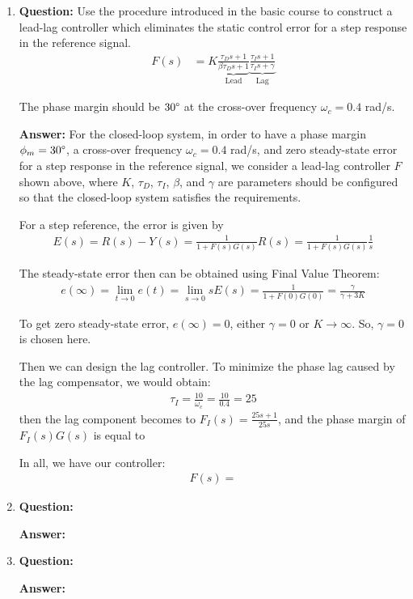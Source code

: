 \documentclass[11pt,a4paper]{article}
\begin{document}
\begin{enumerate}
	\item \textbf{Question:} Use the procedure introduced in the basic course to construct a lead-lag controller which eliminates the static control error for a step response in the reference signal.
	\begin{align*}
		F(s) &= K\underbrace{\frac{\tau_{D}s+1}{\beta\tau_{D}s+1}}_{\mathrm{Lead}}\underbrace{\frac{\tau_{I}s+1}{\tau_{I}s+\gamma}}_{\mathrm{Lag}}
	\end{align*}
	\par The phase margin should be $30\degree$ at the cross-over frequency $\omega_{c}=0.4$ rad/s.
	\par \textbf{Answer:} For the closed-loop system, in order to have a phase margin $\phi_{m}=30\degree$, a cross-over frequency $\omega_{c}=0.4$ rad/s, and zero steady-state error for a step response in the reference signal, we consider a lead-lag controller $F$ shown above, where $K$, $\tau_{D}$, $\tau_{I}$, $\beta$, and $\gamma$ are parameters should be configured so that the closed-loop system satisfies the requirements.
	\par For a step reference, the error is given by
	\begin{align*}
		E(s) = R(s) - Y(s) = \frac{1}{1+F(s)G(s)}R(s) = \frac{1}{1+F(s)G(s)}\frac{1}{s}
	\end{align*}
	\par The steady-state error then can be obtained using Final Value Theorem:
	\begin{align*}
		e(\infty) = \lim_{t\rightarrow 0}e(t) = \lim_{s\rightarrow 0} sE(s) = \frac{1}{1+F(0)G(0)} = \frac{\gamma}{\gamma + 3K}
	\end{align*}
	\par To get zero steady-state error, $e(\infty) = 0$, either $\gamma = 0$ or $K \rightarrow \infty$. So, $\gamma = 0$ is chosen here.
	\par Then we can design the lag controller. To minimize the phase lag caused by the lag compensator, we would obtain:
	\begin{align*}
		\tau_{I} = \frac{10}{\omega_{c}} = \frac{10}{0.4} = 25
	\end{align*}
	then the lag component becomes to $F_{I}(s) = \frac{25s+1}{25s}$, and the phase margin of $F_{I}(s)G(s)$ is equal to 
	
	\par In all, we have our controller:
	\begin{align*}
		F(s) = 
	\end{align*}
	
	\item \textbf{Question:} 
	\par \textbf{Answer:}
	
	\item \textbf{Question:} 
	\par \textbf{Answer:} 
\end{enumerate}
\end{document}
